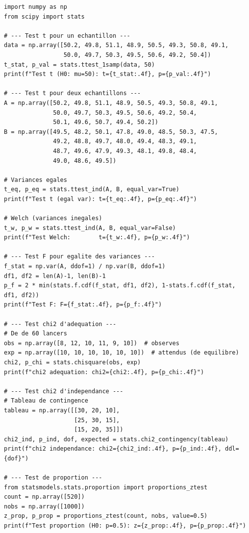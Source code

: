 \begin{python}
\begin{verbatim}
import numpy as np
from scipy import stats

# --- Test t pour un echantillon ---
data = np.array([50.2, 49.8, 51.1, 48.9, 50.5, 49.3, 50.8, 49.1,
                 50.0, 49.7, 50.3, 49.5, 50.6, 49.2, 50.4])
t_stat, p_val = stats.ttest_1samp(data, 50)
print(f"Test t (H0: mu=50): t={t_stat:.4f}, p={p_val:.4f}")

# --- Test t pour deux echantillons ---
A = np.array([50.2, 49.8, 51.1, 48.9, 50.5, 49.3, 50.8, 49.1,
              50.0, 49.7, 50.3, 49.5, 50.6, 49.2, 50.4,
              50.1, 49.6, 50.7, 49.4, 50.2])
B = np.array([49.5, 48.2, 50.1, 47.8, 49.0, 48.5, 50.3, 47.5,
              49.2, 48.8, 49.7, 48.0, 49.4, 48.3, 49.1,
              48.7, 49.6, 47.9, 49.3, 48.1, 49.8, 48.4,
              49.0, 48.6, 49.5])

# Variances egales
t_eq, p_eq = stats.ttest_ind(A, B, equal_var=True)
print(f"Test t (egal var): t={t_eq:.4f}, p={p_eq:.4f}")

# Welch (variances inegales)
t_w, p_w = stats.ttest_ind(A, B, equal_var=False)
print(f"Test Welch:        t={t_w:.4f}, p={p_w:.4f}")

# --- Test F pour egalite des variances ---
f_stat = np.var(A, ddof=1) / np.var(B, ddof=1)
df1, df2 = len(A)-1, len(B)-1
p_f = 2 * min(stats.f.cdf(f_stat, df1, df2), 1-stats.f.cdf(f_stat, df1, df2))
print(f"Test F: F={f_stat:.4f}, p={p_f:.4f}")

# --- Test chi2 d'adequation ---
# De de 60 lancers
obs = np.array([8, 12, 10, 11, 9, 10])  # observes
exp = np.array([10, 10, 10, 10, 10, 10])  # attendus (de equilibre)
chi2, p_chi = stats.chisquare(obs, exp)
print(f"chi2 adequation: chi2={chi2:.4f}, p={p_chi:.4f}")

# --- Test chi2 d'independance ---
# Tableau de contingence
tableau = np.array([[30, 20, 10],
                    [25, 30, 15],
                    [15, 20, 35]])
chi2_ind, p_ind, dof, expected = stats.chi2_contingency(tableau)
print(f"chi2 independance: chi2={chi2_ind:.4f}, p={p_ind:.4f}, ddl={dof}")

# --- Test de proportion ---
from statsmodels.stats.proportion import proportions_ztest
count = np.array([520])
nobs = np.array([1000])
z_prop, p_prop = proportions_ztest(count, nobs, value=0.5)
print(f"Test proportion (H0: p=0.5): z={z_prop:.4f}, p={p_prop:.4f}")
\end{verbatim}
\end{python}

